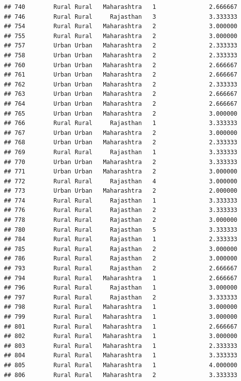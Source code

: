\documentclass[
]{article}
\begin{document}
\begin{verbatim}
## 740        Rural Rural   Maharashtra   1               2.666667
## 746        Rural Rural     Rajasthan   3               3.333333
## 754        Rural Rural   Maharashtra   2               3.000000
## 755        Rural Rural   Maharashtra   2               3.000000
## 757        Urban Urban   Maharashtra   2               2.333333
## 758        Urban Urban   Maharashtra   2               2.333333
## 760        Urban Urban   Maharashtra   2               2.666667
## 761        Urban Urban   Maharashtra   2               2.666667
## 762        Urban Urban   Maharashtra   2               2.333333
## 763        Urban Urban   Maharashtra   2               2.666667
## 764        Urban Urban   Maharashtra   2               2.666667
## 765        Urban Urban   Maharashtra   2               3.000000
## 766        Rural Rural     Rajasthan   1               3.333333
## 767        Urban Urban   Maharashtra   2               3.000000
## 768        Urban Urban   Maharashtra   2               2.333333
## 769        Rural Rural     Rajasthan   1               3.333333
## 770        Urban Urban   Maharashtra   2               3.333333
## 771        Urban Urban   Maharashtra   2               3.000000
## 772        Rural Rural     Rajasthan   4               3.000000
## 773        Urban Urban   Maharashtra   2               2.000000
## 774        Rural Rural     Rajasthan   1               3.333333
## 776        Rural Rural     Rajasthan   2               3.333333
## 778        Rural Rural     Rajasthan   2               3.000000
## 780        Rural Rural     Rajasthan   5               3.333333
## 784        Rural Rural     Rajasthan   1               2.333333
## 785        Rural Rural     Rajasthan   2               3.000000
## 786        Rural Rural     Rajasthan   2               3.000000
## 793        Rural Rural     Rajasthan   2               2.666667
## 794        Rural Rural   Maharashtra   1               2.666667
## 796        Rural Rural     Rajasthan   1               3.000000
## 797        Rural Rural     Rajasthan   2               3.333333
## 798        Rural Rural   Maharashtra   1               3.000000
## 799        Rural Rural   Maharashtra   1               3.000000
## 801        Rural Rural   Maharashtra   1               2.666667
## 802        Rural Rural   Maharashtra   1               3.000000
## 803        Rural Rural   Maharashtra   1               2.333333
## 804        Rural Rural   Maharashtra   1               3.333333
## 805        Rural Rural   Maharashtra   1               4.000000
## 806        Rural Rural   Maharashtra   2               3.333333

\end{verbatim}
\end{document}
